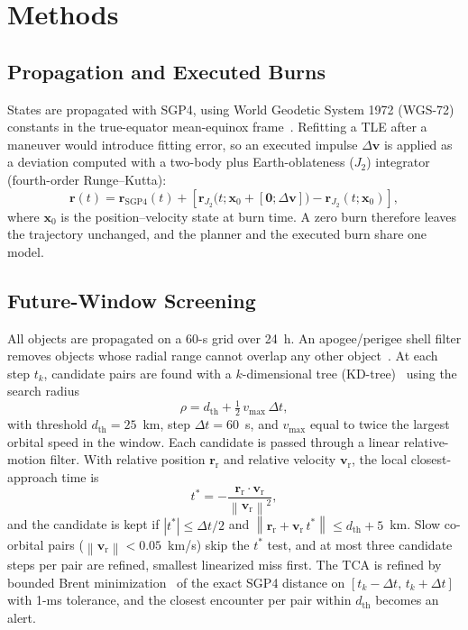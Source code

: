 \documentclass[conference]{IEEEtran}
\newcommand{\bvec}[1]{\mathbf{#1}}
\newcommand{\norm}[1]{\left\|#1\right\|}
\newcommand{\rr}{\bvec{r}_{\mathrm{r}}}
\newcommand{\vr}{\bvec{v}_{\mathrm{r}}}
\begin{document}
\section{Methods}
\label{sec:method}

\subsection{Propagation and Executed Burns}

States are propagated with SGP4, using World Geodetic System 1972 (WGS-72)
constants in the true-equator mean-equinox frame~\cite{hoots1980,vallado2006}.
Refitting a TLE after a maneuver would introduce fitting error, so an executed
impulse $\Delta\bvec{v}$ is applied as a deviation computed with a two-body plus
Earth-oblateness ($J_2$) integrator (fourth-order Runge--Kutta):
\begin{equation}
  \bvec{r}(t) = \bvec{r}_{\mathrm{SGP4}}(t)
  + \left[\bvec{r}_{J_2}\big(t;\bvec{x}_0+[\bvec{0};\Delta\bvec{v}]\big)
          - \bvec{r}_{J_2}(t;\bvec{x}_0)\right],
\label{eq:burn}
\end{equation}
where $\bvec{x}_0$ is the position--velocity state at burn time. A zero burn
therefore leaves the trajectory unchanged, and the planner and the executed burn
share one model.

\subsection{Future-Window Screening}

All objects are propagated on a 60-s grid over 24~h. An apogee/perigee shell
filter removes objects whose radial range cannot overlap any other
object~\cite{hoots1984}. At each step $t_k$, candidate pairs are found with a
$k$-dimensional tree (KD-tree)~\cite{bentley1975} using the search radius
\begin{equation}
  \rho = d_{\mathrm{th}} + \tfrac{1}{2}\,v_{\mathrm{max}}\,\Delta t,
\end{equation}
with threshold $d_{\mathrm{th}}=25$~km, step $\Delta t=60$~s, and
$v_{\mathrm{max}}$ equal to twice the largest orbital speed in the window. Each
candidate is passed through a linear relative-motion filter. With relative
position $\rr$ and relative velocity $\vr$, the local closest-approach time is
\begin{equation}
  t^{*} = -\frac{\rr\cdot\vr}{\norm{\vr}^{2}},
\end{equation}
and the candidate is kept if $|t^{*}|\le\Delta t/2$ and
$\norm{\rr+\vr\,t^{*}}\le d_{\mathrm{th}}+5$~km. Slow co-orbital pairs
($\norm{\vr}<0.05$~km/s) skip the $t^{*}$ test, and at most three candidate
steps per pair are refined, smallest linearized miss first. The TCA is refined
by bounded Brent minimization~\cite{brent1973,virtanen2020} of the exact SGP4
distance on $[t_k-\Delta t,\,t_k+\Delta t]$ with 1-ms tolerance, and the
closest encounter per pair within $d_{\mathrm{th}}$ becomes an alert.
\end{document}
